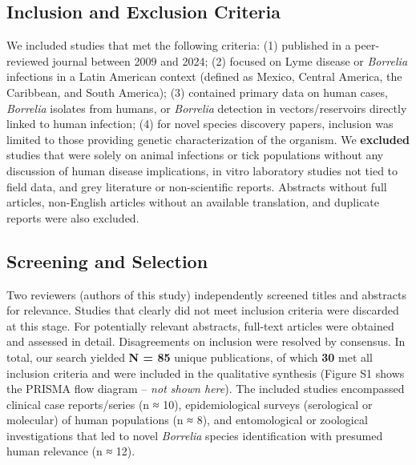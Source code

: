 \documentclass[11pt,letterpaper]{article}
\begin{document}
\subsection{Inclusion and Exclusion Criteria}
We included studies that met the following criteria: (1) published in a peer-reviewed journal between 2009 and 2024; (2) focused on Lyme disease or \textit{Borrelia} infections in a Latin American context (defined as Mexico, Central America, the Caribbean, and South America); (3) contained primary data on human cases, \textit{Borrelia} isolates from humans, or \textit{Borrelia} detection in vectors/reservoirs directly linked to human infection; (4) for novel species discovery papers, inclusion was limited to those providing genetic characterization of the organism. We \textbf{excluded} studies that were solely on animal infections or tick populations without any discussion of human disease implications, in vitro laboratory studies not tied to field data, and grey literature or non-scientific reports. Abstracts without full articles, non-English articles without an available translation, and duplicate reports were also excluded.

\subsection{Screening and Selection}
Two reviewers (authors of this study) independently screened titles and abstracts for relevance. Studies that clearly did not meet inclusion criteria were discarded at this stage. For potentially relevant abstracts, full-text articles were obtained and assessed in detail. Disagreements on inclusion were resolved by consensus. In total, our search yielded \textbf{N = 85} unique publications, of which \textbf{30} met all inclusion criteria and were included in the qualitative synthesis (Figure S1 shows the PRISMA flow diagram – \textit{not shown here}). The included studies encompassed clinical case reports/series (n ≈ 10), epidemiological surveys (serological or molecular) of human populations (n ≈ 8), and entomological or zoological investigations that led to novel \textit{Borrelia} species identification with presumed human relevance (n ≈ 12).
\end{document}
